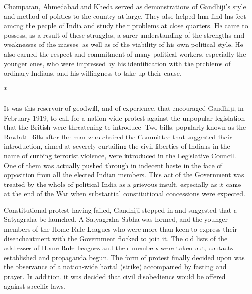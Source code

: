 \begin{multicols}{2}
Champaran, Ahmedabad and Kheda served as demonstrations of Gandhiji's style and method of politics to the country at large. They also helped him find his feet among the people of India and study their problems at close quarters. He came to possess, as a result of these struggles, a surer understanding of the strengths and weaknesses of the masses, as well as of the viability of his own political style. He also earned the respect and commitment of many political workers, especially the younger ones, who were impressed by his identification with the problems of ordinary Indians, and his willingness to take up their cause.

\begin{center}*\end{center}

\paragraph*{}

It was this reservoir of goodwill, and of experience, that encouraged Gandhiji, in February 1919, to call for a nation-wide protest against the unpopular legislation that the British were threatening to introduce. Two bills, popularly known as the Rowlatt Bills after the man who chaired the Committee that suggested their introduction, aimed at severely curtailing the civil liberties of Indians in the name of curbing terrorist violence, were introduced in the Legislative Council. One of them was actually pushed through in indecent haste in the face of opposition from all the elected Indian members. This act of the Government was treated by the whole of political India as a grievous insult, especially as it came at the end of the War when substantial constitutional concessions were expected.

Constitutional protest having failed, Gandhiji stepped in and suggested that a Satyagraha be launched. A Satyagraha Sabha was formed, and the younger members of the Home Rule Leagues who were more than keen to express their disenchantment with the Government flocked to join it. The old lists of the addresses of Home Rule Leagues and their members were taken out, contacts established and propaganda begun. The form of protest finally decided upon was the observance of a nation-wide hartal (strike) accompanied by fasting and prayer. In addition, it was decided that civil disobedience would be offered against specific laws.


\end{multicols}
